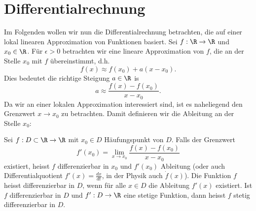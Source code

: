 \documentclass[letterpaper,10pt,english]{jupyterBook}
\begin{document}
\chapter{Differentialrechnung}
\label{\detokenize{differential/differential:differentialrechnung}}\label{\detokenize{differential/differential::doc}}
Im Folgenden wollen wir nun die Differentialrechnung betrachten, die auf einer lokal linearen Approximation von Funktionen basiert. Sei \(f: \R \rightarrow \R\) und \(x_0 \in \R\). Für \(\epsilon > 0\) betrachten wir eine lineare Approximation von \(f\), die an der Stelle \(x_0\) mit \(f\) übereinstimmt, d.h.
\begin{equation*}
 f(x) \approx f(x_0) + a (x-x_0).
\end{equation*}
Dies bedeutet die richtige Steigung \(a \in \R\) is
\begin{equation*}
 a \approx \frac{f(x)-f(x_0)}{x-x_0} .
\end{equation*}
Da wir an einer lokalen Approximation interessiert sind, ist es naheliegend den Grenzwert \(x \rightarrow x_0\) zu betrachten. Damit definieren wir die Ableitung an der Stelle \(x_0\):
\label{differential/differential:definition-0}
\begin{definition}{}{}



Sei \(f: D \subset \R \rightarrow \R\) mit \(x_0 \in D\) Häufungspunkt von \(D\). Falls der Grenzwert
\begin{equation*}
 f'(x_0) = \lim_{x \rightarrow x_0} \frac{f(x) - f(x_0)}{x-x_0}
\end{equation*}
existiert, heisst \(f\) differenzierbar in \(x_0\) und \(f'(x_0)\) Ableitung  (oder auch Differentialquotient \(f'(x) = \frac{dx}{dt}\), in der Physik auch \(\dot f(x)\)). Die Funktion \(f\) heisst differenzierbar in \(D\), wenn für alle \(x \in D\) die Ableitung \(f'(x)\) existiert.
Ist \(f\) differenzierbar in \(D\) und \(f':D \rightarrow \R\) eine stetige Funktion, dann heisst \(f\) stetig differenzierbar in \(D\).
\end{definition}
\end{document}
